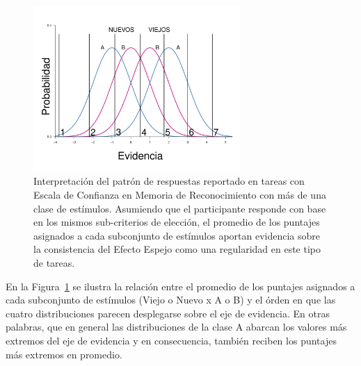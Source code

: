 \begin{itemize}
\begin{figure}[th]
\centering
\includegraphics[width=0.7\textwidth]{Figures/EfectoEspejo_Puntajes}
\caption[Representación gráfica del Efecto Espejo, de acuerdo con el patrón de respuestas registrado en tareas con Escala de Confianza]{Interpretación del patrón de respuestas reportado en tareas con Escala de Confianza en Memoria de Reconocimiento con más de una clase de estímulos. Asumiendo que el participante responde con base en los mismos sub-criterios de elección, el promedio de los puntajes asignados a cada subconjunto de estímulos aportan evidencia sobre la consistencia del Efecto Espejo como una regularidad en este tipo de tareas.}
\label{fig:Ejem_Efecto_Punt}
\end{figure}

En la Figura~\ref{fig:Ejem_Efecto_Punt} se ilustra la relación entre el promedio de los puntajes asignados a cada subconjunto de estímulos (Viejo o Nuevo x A o B) y el órden en que las cuatro distribuciones parecen desplegarse sobre el eje de evidencia. En otras palabras, que en general las distribuciones de la clase A abarcan los valores más extremos del eje de evidencia y en consecuencia, también reciben los puntajes más extremos en promedio.\\





\end{itemize}
